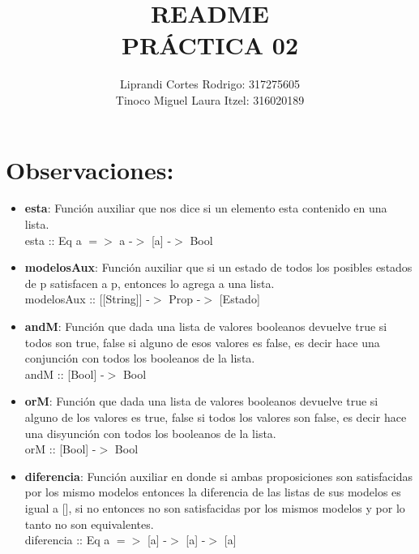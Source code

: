 \documentclass[]{article}
\title{README \\ PR\'ACTICA 02}
\author{Liprandi Cortes Rodrigo: 317275605 \\ Tinoco Miguel Laura Itzel: 316020189}
\begin{document}
\maketitle


\section{Observaciones:}
	\begin{itemize}
		\item \textbf{esta}: Funci\'on auxiliar que nos dice si un elemento esta contenido en una lista.\\
		 esta :: Eq a $=>$ a -$>$ [a] -$>$ Bool
		 
		 \item \textbf{modelosAux}: Funci\'on auxiliar que si un estado de todos los posibles estados de p satisfacen a p, entonces lo agrega a una lista.\\
		 modelosAux :: [[String]] -$>$ Prop -$>$ [Estado]
		 
		 \item \textbf{andM}: Funci\'on que dada una lista de valores booleanos devuelve true si todos son true, false si alguno de esos valores es false, es decir hace una conjunción con todos los booleanos de la lista.\\
		 andM :: [Bool] -$>$ Bool
		 
		 \item \textbf{orM}: Funci\'on que dada una lista de valores booleanos devuelve true si alguno de los valores es true, false si todos los valores son false, es decir hace una disyunción con todos los booleanos de la lista.\\
		 orM :: [Bool] -$>$ Bool
		 
		 \item \textbf{diferencia}: Funci\'on auxiliar en donde si ambas proposiciones son satisfacidas por los mismo modelos entonces la diferencia
		 de las listas de sus modelos es igual a [], si no entonces no son satisfacidas por los mismos modelos y por lo tanto no son equivalentes.\\
		 diferencia :: Eq a $=>$ [a] -$>$ [a] -$>$ [a]
	\end{itemize}
\end{document}
